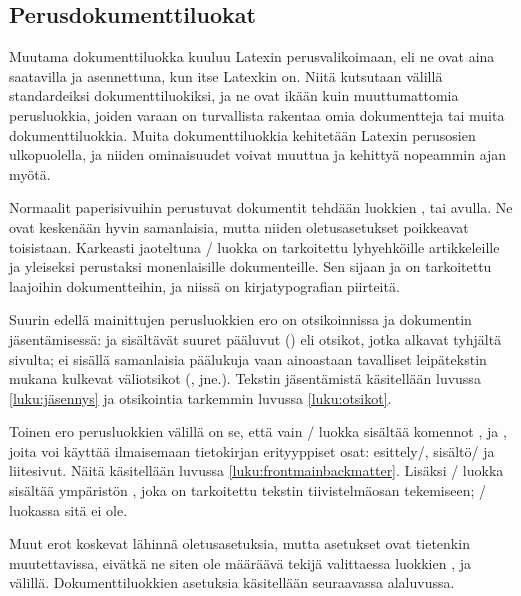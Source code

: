 
\subsection{Perusdokumenttiluokat}
\label{luku:perusdokumenttiluokat}

Muutama dokumenttiluokka kuuluu Latexin perusvalikoimaan, eli ne ovat
aina saatavilla ja asennettuna, kun itse Latexkin on. Niitä kutsutaan
välillä standardeiksi dokumenttiluokiksi, ja ne ovat ikään kuin
muuttumattomia perusluokkia, joiden varaan on turvallista rakentaa omia
dokumentteja tai muita dokumenttiluokkia. Muita dokumenttiluokkia
kehitetään Latexin perusosien ulkopuolella, ja niiden ominaisuudet
voivat muuttua ja kehittyä nopeammin ajan myötä.

Normaalit paperisivuihin perustuvat dokumentit tehdään luokkien
,  tai  avulla. Ne ovat
keskenään hyvin samanlaisia, mutta niiden oletusasetukset poikkeavat
toisistaan. Karkeasti jaoteltuna \-/ luokka on
tarkoitettu lyhyehköille artikkeleille ja yleiseksi perustaksi
monenlaisille dokumenteille. Sen sijaan  ja 
on tarkoitettu laajoihin dokumentteihin, ja niissä on kirjatypografian
piirteitä.

Suurin edellä mainittujen perusluokkien ero on otsikoinnissa ja
dokumentin jäsentämisessä:  ja  sisältävät
suuret pääluvut () eli otsikot, jotka alkavat tyhjältä
sivulta;  ei sisällä samanlaisia päälukuja vaan
ainoastaan tavalliset leipätekstin mukana kulkevat väliotsikot
(,  jne.). Tekstin jäsentämistä
käsitellään luvussa \ref{luku:jäsennys} ja otsikointia tarkemmin luvussa
\ref{luku:otsikot}.

Toinen ero perusluokkien välillä on se, että vain \-/
luokka sisältää komennot ,  ja
, joita voi käyttää ilmaisemaan tietokirjan
erityyppiset osat: esittely\-/, sisältö\-/{} ja liitesivut. Näitä
käsitellään luvussa \ref{luku:frontmainbackmatter}. Lisäksi
\-/ luokka sisältää ympäristön , joka
on tarkoitettu tekstin tiivistelmäosan tekemiseen; \-/
luokassa sitä ei ole.

Muut erot koskevat lähinnä oletusasetuksia, mutta asetukset ovat
tietenkin muutettavissa, eivätkä ne siten ole määräävä tekijä
valittaessa luokkien ,  ja 
välillä. Dokumenttiluokkien asetuksia käsitellään seuraavassa
alaluvussa.

